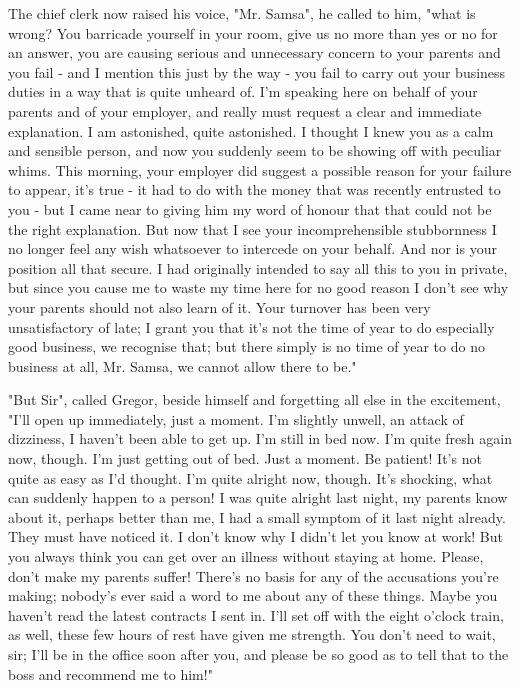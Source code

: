 The chief clerk now raised his voice, "Mr. Samsa", he called to him, "what is wrong? You barricade yourself in your room, give us no more than yes or no for an answer, you are causing serious and unnecessary concern to your parents and you fail - and I mention this just by the way - you fail to carry out your business duties in a way that is quite unheard of. I'm speaking here on behalf of your parents and of your employer, and really must request a clear and immediate explanation. I am astonished, quite astonished. I thought I knew you as a calm and sensible person, and now you suddenly seem to be showing off with peculiar whims. This morning, your employer did suggest a possible reason for your failure to appear, it's true - it had to do with the money that was recently entrusted to you - but I came near to giving him my word of honour that that could not be the right explanation. But now that I see your incomprehensible stubbornness I no longer feel any wish whatsoever to intercede on your behalf. And nor is your position all that secure. I had originally intended to say all this to you in private, but since you cause me to waste my time here for no good reason I don't see why your parents should not also learn of it. Your turnover has been very unsatisfactory of late; I grant you that it's not the time of year to do especially good business, we recognise that; but there simply is no time of year to do no business at all, Mr. Samsa, we cannot allow there to be."

"But Sir", called Gregor, beside himself and forgetting all else in the excitement, "I'll open up immediately, just a moment. I'm slightly unwell, an attack of dizziness, I haven't been able to get up. I'm still in bed now. I'm quite fresh again now, though. I'm just getting out of bed. Just a moment. Be patient! It's not quite as easy as I'd thought. I'm quite alright now, though. It's shocking, what can suddenly happen to a person! I was quite alright last night, my parents know about it, perhaps better than me, I had a small symptom of it last night already. They must have noticed it. I don't know why I didn't let you know at work! But you always think you can get over an illness without staying at home. Please, don't make my parents suffer! There's no basis for any of the accusations you're making; nobody's ever said a word to me about any of these things. Maybe you haven't read the latest contracts I sent in. I'll set off with the eight o'clock train, as well, these few hours of rest have given me strength. You don't need to wait, sir; I'll be in the office soon after you, and please be so good as to tell that to the boss and recommend me to him!"


